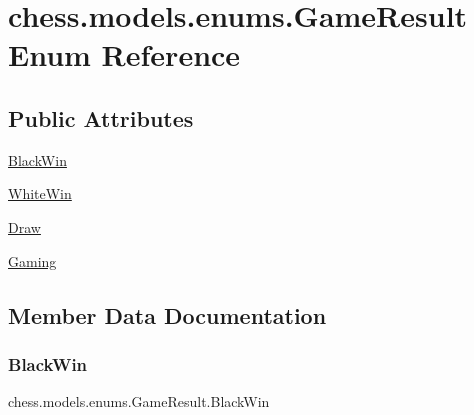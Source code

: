 \hypertarget{enumchess_1_1models_1_1enums_1_1_game_result}{}\section{chess.\+models.\+enums.\+Game\+Result Enum Reference}
\label{enumchess_1_1models_1_1enums_1_1_game_result}
\subsection*{Public Attributes}
\begin{DoxyCompactItemize}
\item 
\mbox{\hyperlink{enumchess_1_1models_1_1enums_1_1_game_result_ac45a99e6bed59ba2fa6b229383229195}{Black\+Win}}
\item 
\mbox{\hyperlink{enumchess_1_1models_1_1enums_1_1_game_result_ab484738f8e1b5994fb669ee8d6d02158}{White\+Win}}
\item 
\mbox{\hyperlink{enumchess_1_1models_1_1enums_1_1_game_result_affcb10bb1b037bc3b20972e49b91a7f0}{Draw}}
\item 
\mbox{\hyperlink{enumchess_1_1models_1_1enums_1_1_game_result_a934fd181ee21601ba0e5fb875edd150b}{Gaming}}
\end{DoxyCompactItemize}


\subsection{Member Data Documentation}
\mbox{\label{enumchess_1_1models_1_1enums_1_1_game_result_ac45a99e6bed59ba2fa6b229383229195}} 
\subsubsection{\texorpdfstring{Black\+Win}{BlackWin}}
{\footnotesize\ttfamily chess.\+models.\+enums.\+Game\+Result.\+Black\+Win}

\mbox{\label{enumchess_1_1models_1_1enums_1_1_game_result_affcb10bb1b037bc3b20972e49b91a7f0}} 
